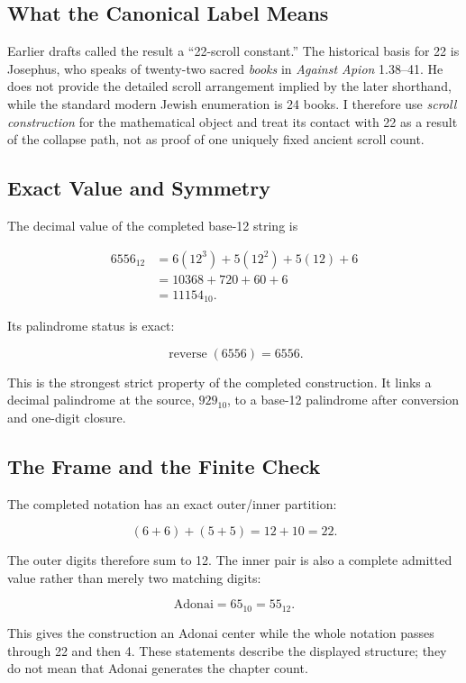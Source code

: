 \subsection{What the Canonical Label Means}

Earlier drafts called the result a ``22-scroll constant.'' The historical basis for 22 is Josephus, who speaks of twenty-two sacred \emph{books} in \emph{Against Apion} 1.38--41.\cite{josephus22} He does not provide the detailed scroll arrangement implied by the later shorthand, while the standard modern Jewish enumeration is 24 books.\cite{bible_canon24} I therefore use \emph{scroll construction} for the mathematical object and treat its contact with 22 as a result of the collapse path, not as proof of one uniquely fixed ancient scroll count.

\subsection{Exact Value and Symmetry}

The decimal value of the completed base-12 string is

\begin{align*}
6556_{12}
&=6(12^3)+5(12^2)+5(12)+6\\
&=10368+720+60+6\\
&=11154_{10}.
\end{align*}

Its palindrome status is exact:

\[
\operatorname{reverse}(6556)=6556.
\]

This is the strongest strict property of the completed construction. It links a decimal palindrome at the source, $929_{10}$, to a base-12 palindrome after conversion and one-digit closure.

\subsection{The Frame and the Finite Check}

The completed notation has an exact outer/inner partition:

\[
(6+6)+(5+5)=12+10=22.
\]

The outer digits therefore sum to 12. The inner pair is also a complete admitted value rather than merely two matching digits:

\[
\text{Adonai}=65_{10}=55_{12}.
\]

This gives the construction an Adonai center while the whole notation passes through 22 and then 4. These statements describe the displayed structure; they do not mean that Adonai generates the chapter count.

